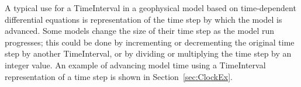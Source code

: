 
A typical use for a TimeInterval in a geophysical model 
based on time-dependent differential equations is representation of 
the time step by which the model is advanced.  Some models change 
the size of their time step as the model run progresses; this could
be done by incrementing or decrementing the original time 
step by another TimeInterval, or by dividing or multiplying
the time step by an integer value.  An example of advancing 
model time using a TimeInterval representation of a time
step is shown in Section~\ref{sec:ClockEx}.



